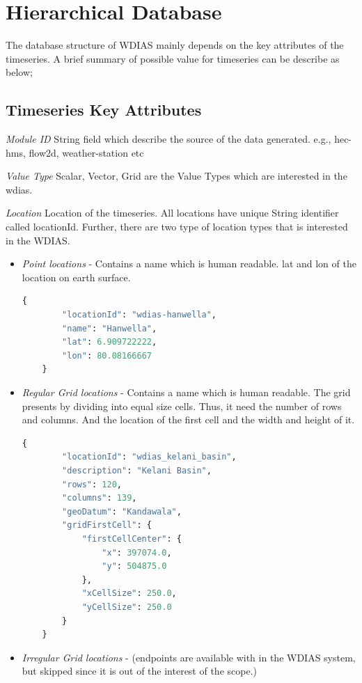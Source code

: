 \section{Hierarchical Database}

The database structure of WDIAS mainly depends on the key attributes of the timeseries. A brief summary of possible value for timeseries can be describe as below;

\subsection{Timeseries Key Attributes}
\label{sub:timeseries_key_attributes}
\emph{Module ID}
String field which describe the source of the data generated. e.g., hec-hms, flow2d, weather-station etc

\emph{Value Type}
Scalar, Vector, Grid are the Value Types which are interested in the \acrshort{wdias}.

\emph{Location}
Location of the timeseries. All locations have unique String identifier called locationId. Further, there are two type of location types that is interested in the WDIAS.
\begin{itemize}
  \item \emph{Point locations} - Contains a name which is human readable. lat and lon of the location on earth surface.
  \begin{lstlisting}[language=Python]
    {
        "locationId": "wdias-hanwella",
        "name": "Hanwella",
        "lat": 6.909722222,
        "lon": 80.08166667
    }
  \end{lstlisting}
  \item \emph{Regular Grid locations} - Contains a name which is human readable. The grid presents by dividing into equal size cells. Thus, it need the number of rows and columns. 
  And the location of the first cell and the width and height of it.
  \begin{lstlisting}[language=Python]
      {
        "locationId": "wdias_kelani_basin",
        "description": "Kelani Basin",
        "rows": 120,
        "columns": 139,
        "geoDatum": "Kandawala",
        "gridFirstCell": {
            "firstCellCenter": {
                "x": 397074.0,
                "y": 504875.0
            },
            "xCellSize": 250.0,
            "yCellSize": 250.0
        }
    }
  \end{lstlisting}
  \item \emph{Irregular Grid locations} - (endpoints are available with in the WDIAS system, but skipped since it is out of the interest of the scope.)
\end{itemize}

